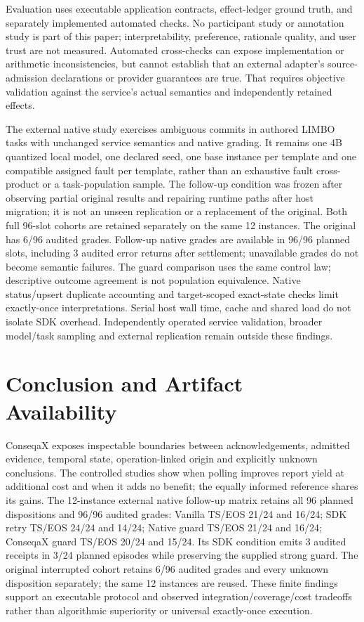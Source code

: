 \documentclass[conference]{IEEEtran}
\begin{document}
Evaluation uses executable application contracts, effect-ledger ground truth, and separately implemented automated checks. No participant study or annotation study is part of this paper; interpretability, preference, rationale quality, and user trust are not measured. Automated cross-checks can expose implementation or arithmetic inconsistencies, but cannot establish that an external adapter's source-admission declarations or provider guarantees are true. That requires objective validation against the service's actual semantics and independently retained effects.

The external native study exercises ambiguous commits in authored LIMBO tasks with unchanged service semantics and native grading. It remains one 4B quantized local model, one declared seed, one base instance per template and one compatible assigned fault per template, rather than an exhaustive fault cross-product or a task-population sample. The follow-up condition was frozen after observing partial original results and repairing runtime paths after host migration; it is not an unseen replication or a replacement of the original. Both full 96-slot cohorts are retained separately on the same 12 instances. The original has 6/96 audited grades. Follow-up native grades are available in 96/96 planned slots, including 3 audited error returns after settlement; unavailable grades do not become semantic failures. The guard comparison uses the same control law; descriptive outcome agreement is not population equivalence. Native status/upsert duplicate accounting and target-scoped exact-state checks limit exactly-once interpretations. Serial host wall time, cache and shared load do not isolate SDK overhead. Independently operated service validation, broader model/task sampling and external replication remain outside these findings.

\section{Conclusion and Artifact Availability}

ConseqaX exposes inspectable boundaries between acknowledgements, admitted evidence, temporal state, operation-linked origin and explicitly unknown conclusions. The controlled studies show when polling improves report yield at additional cost and when it adds no benefit; the equally informed reference shares its gains. The 12-instance external native follow-up matrix retains all 96 planned dispositions and 96/96 audited grades: Vanilla TS/EOS 21/24 and 16/24; SDK retry TS/EOS 24/24 and 14/24; Native guard TS/EOS 21/24 and 16/24; ConseqaX guard TS/EOS 20/24 and 15/24. Its SDK condition emits 3 audited receipts in 3/24 planned episodes while preserving the supplied strong guard. The original interrupted cohort retains 6/96 audited grades and every unknown disposition separately; the same 12 instances are reused. These finite findings support an executable protocol and observed integration/coverage/cost tradeoffs rather than algorithmic superiority or universal exactly-once execution.
\end{document}
